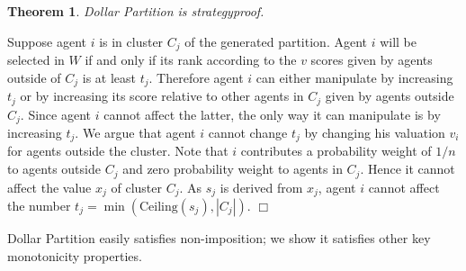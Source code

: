 \documentclass[letterpaper]{article}
\newtheorem{theorem}{Theorem}
\newcommand{\qed}{\unskip\hspace*{1em}\hspace{\fill}$\Box$}
\newenvironment{proof}[1][Proof]{\begin{trivlist}
 \item[\hskip \labelsep {\it #1:}]}{%
 \qed\end{trivlist}}
\begin{document}
\begin{theorem}
	Dollar Partition is strategyproof.
	\end{theorem}
	\begin{proof}
		Suppose agent $i$ is in cluster $C_j$ of the generated partition. Agent $i$ will be selected in $W$ if and only if its rank according to the $v$ scores given by agents outside of $C_j$ is at least $t_j$. Therefore agent $i$ can either manipulate by increasing $t_j$ or by increasing its score relative to other agents in $C_j$ given by agents outside $C_j$. Since agent $i$ cannot affect the latter, the only way it can manipulate is by increasing $t_j$.
		We argue that agent $i$ cannot change $t_j$ by changing his valuation $v_i$ for agents outside the cluster. Note that $i$ contributes a probability weight of $1/n$ to agents outside $C_j$ and zero probability weight to agents in $C_j$. Hence it cannot affect the value $x_j$ of cluster $C_j$. As $s_j$ is derived from $x_j$, agent $i$ cannot affect the number $t_j= \min({\text{Ceiling}(s_j)},|C_j|)$.
	\end{proof}

	Dollar Partition easily satisfies non-imposition; we show it satisfies other
	key monotonicity properties.



\end{document}

